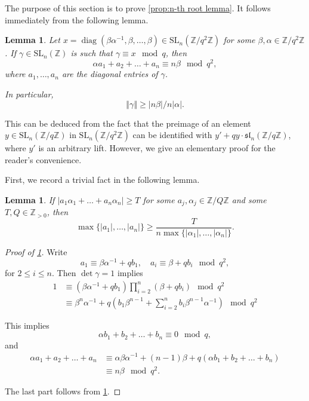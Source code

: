 \documentclass[12pt, a4paper]{amsart}
\numberwithin{equation}{section}
\newtheorem{lemma}[theorem]{Lemma}
\theoremstyle{definition}
\newcommand{\Z}{\mathbb{Z}}
\newcommand{\SL}{\mathrm{SL}}
\newcommand{\n}[1]{\left\Vert #1\right\Vert }
\begin{document}
The purpose of this section is to prove \cref{prop:n-th root lemma}.
It follows immediately from the following lemma.

\begin{lemma}\label{lem:lifting diagonal}
Let $x=\operatorname{diag}(\beta \alpha^{-1},\beta,\ldots,\beta)\in\SL_n(\Z/q^{2}\Z)$
for some $\beta,\alpha\in\Z/q^{2}\Z$. If $\gamma\in\SL_n(\Z)$ is such
that $\gamma\equiv x\mod q$, then
\[
\alpha a_{1}+a_{2}+\ldots+a_{n}\equiv n\beta \mod q^2,
\]
where $a_{1},\ldots,a_{n}$ are the diagonal entries of $\gamma$.

In particular,
\[
\n{\gamma}\ge\left|n\beta\right|/n|\alpha|.
\]
\end{lemma}

This can be deduced from the fact that the preimage of
an element $y\in \SL_n(\Z/q\Z)$ in $\SL_n(\Z/q^2\Z)$ can be identified with
$y'+qy\cdot\mathfrak{sl}_n(\Z/q\Z)$, where $y'$ is an arbitrary lift.
However, we give an elementary proof for the reader's convenience.

First, we record a trivial fact in the following lemma.

\begin{lemma}\label{lem:trivial lemma}
If $\left|a_{1}\alpha_{1}+\ldots+a_{n}\alpha_{n}\right|\ge T$ for some
$a_j,\alpha_j\in\Z/Q\Z$ and some $T,Q\in\Z_{>0}$, then
\[
\max\{\left|a_{1}\right|,\ldots,|a_{n}|\}\ge\frac{T}{n\max\{|\alpha_{1}|,\ldots,\left|\alpha_{n}\right|\}}.
\]
\end{lemma}

\begin{proof}[Proof of \cref{lem:lifting diagonal}]
Write
\[
a_{1}\equiv\beta \alpha^{-1}+qb_{1},\quad a_{i}\equiv\beta+qb_{i}\mod q^2,
\]
for $2\le i\le n$.
Then $\det\gamma=1$ implies 
\begin{align*}
1 & \equiv(\beta \alpha^{-1}+qb_{1})\prod_{i=2}^{n}(\beta+qb_{i})\mod q^2\\
 & \equiv\beta^{n}\alpha^{-1}+q\left(b_{1}\beta^{n-1}+\sum_{i=2}^{n}b_{i}\beta^{n-1}\alpha^{-1}\right)\mod q^{2}
\end{align*}

This implies 
\[
\alpha b_{1}+b_{2}+\ldots+b_{n}\equiv0\mod q,
\]
and 
\begin{align*}
\alpha a_{1}+a_{2}+\ldots+a_{n} & \equiv \alpha\beta \alpha^{-1}+(n-1)\beta+q\left(\alpha b_{1}+b_{2}+\ldots+b_{n}\right)\\
 & \equiv n\beta\mod q^{2}.
\end{align*}

The last part follows from \cref{lem:trivial lemma}.
\end{proof}
\end{document}
